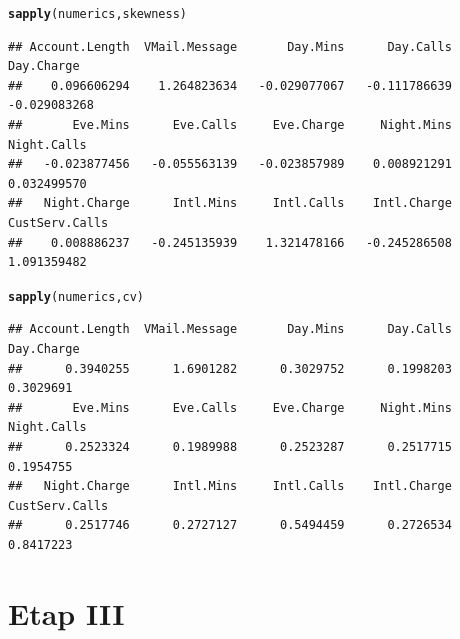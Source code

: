 \documentclass{article}\usepackage[]{graphicx}\usepackage[]{color}
\makeatletter
\newcommand{\hlstd}[1]{\textcolor[rgb]{0.345,0.345,0.345}{#1}}%
\newcommand{\hlkwd}[1]{\textcolor[rgb]{0.737,0.353,0.396}{\textbf{#1}}}%
\newenvironment{kframe}{%
 \def\at@end@of@kframe{}%
 \ifinner\ifhmode%
  \def\at@end@of@kframe{\end{minipage}}%
  \begin{minipage}{\columnwidth}%
 \fi\fi%
 \def\FrameCommand##1{\hskip\@totalleftmargin \hskip-\fboxsep
 \colorbox{shadecolor}{##1}\hskip-\fboxsep
     \hskip-\linewidth \hskip-\@totalleftmargin \hskip\columnwidth}%
 \MakeFramed {\advance\hsize-\width
   \@totalleftmargin\z@ \linewidth\hsize
   \@setminipage}}%
 {\par\unskip\endMakeFramed%
 \at@end@of@kframe}
\newenvironment{knitrout}{}{} %
\makeatother
\begin{document}
\begin{description}
\begin{knitrout}
\color{fgcolor}\begin{kframe}
\begin{alltt}
\hlkwd{sapply}\hlstd{(numerics, skewness)}
\end{alltt}
\begin{verbatim}
## Account.Length  VMail.Message       Day.Mins      Day.Calls     Day.Charge 
##    0.096606294    1.264823634   -0.029077067   -0.111786639   -0.029083268 
##       Eve.Mins      Eve.Calls     Eve.Charge     Night.Mins    Night.Calls 
##   -0.023877456   -0.055563139   -0.023857989    0.008921291    0.032499570 
##   Night.Charge      Intl.Mins     Intl.Calls    Intl.Charge CustServ.Calls 
##    0.008886237   -0.245135939    1.321478166   -0.245286508    1.091359482
\end{verbatim}
\begin{alltt}
\hlkwd{sapply}\hlstd{(numerics, cv)}
\end{alltt}
\begin{verbatim}
## Account.Length  VMail.Message       Day.Mins      Day.Calls     Day.Charge 
##      0.3940255      1.6901282      0.3029752      0.1998203      0.3029691 
##       Eve.Mins      Eve.Calls     Eve.Charge     Night.Mins    Night.Calls 
##      0.2523324      0.1989988      0.2523287      0.2517715      0.1954755 
##   Night.Charge      Intl.Mins     Intl.Calls    Intl.Charge CustServ.Calls 
##      0.2517746      0.2727127      0.5494459      0.2726534      0.8417223
\end{verbatim}
\end{kframe}
\end{knitrout}

\end{description}

\section{Etap III}
\end{document}
